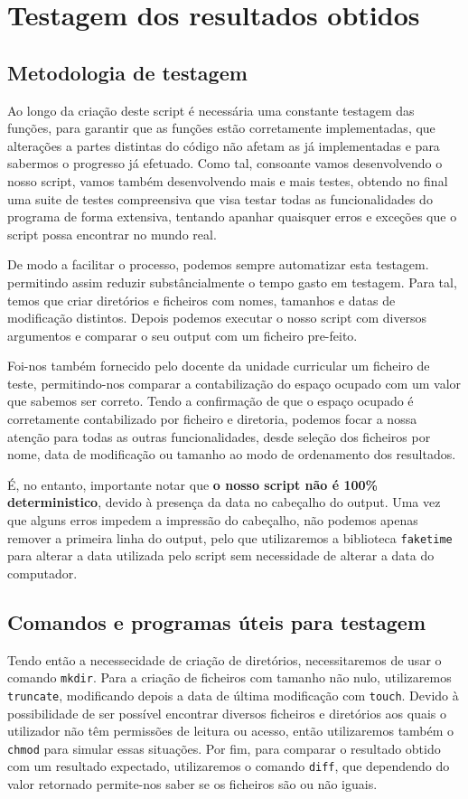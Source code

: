 \chapter{Testagem dos resultados obtidos}
\section{Metodologia de testagem}
Ao longo da criação deste script é necessária uma constante
testagem das funções, para garantir que as funções estão
corretamente implementadas, que alterações a partes
distintas do código não afetam as já implementadas e para
sabermos o progresso já efetuado. Como tal, consoante vamos
desenvolvendo o nosso script, vamos também desenvolvendo mais e
mais testes, obtendo no final uma suite de testes compreensiva
que visa testar todas as funcionalidades do programa de forma
extensiva, tentando apanhar quaisquer erros e exceções que o
script possa encontrar no mundo real.

De modo a facilitar o processo, podemos
sempre automatizar esta testagem. permitindo assim reduzir
substâncialmente o tempo gasto em testagem.
Para tal, temos que criar diretórios e ficheiros com nomes,
tamanhos e datas de modificação distintos. Depois podemos
executar o nosso script com diversos argumentos e comparar o
seu output com um ficheiro pre-feito.

Foi-nos também fornecido pelo docente da unidade
curricular um ficheiro de teste, permitindo-nos comparar a 
contabilização do espaço ocupado com um valor que sabemos ser 
correto. Tendo a confirmação de que o espaço ocupado é
corretamente contabilizado por ficheiro e diretoria, podemos
focar a nossa atenção para todas as outras funcionalidades,
desde seleção dos ficheiros por nome, data de modificação ou
tamanho ao modo de ordenamento dos resultados.

É, no entanto, importante notar que \textbf{o nosso script não é 100\%
deterministico}, devido à presença da data no cabeçalho do
output. Uma vez que alguns erros impedem a impressão do
cabeçalho, não podemos apenas remover a primeira linha do
output, pelo que utilizaremos a biblioteca \verb|faketime| para
alterar a data utilizada pelo script sem necessidade de alterar
a data do computador.

\section{Comandos e programas úteis para testagem}
Tendo então a necessecidade de criação de diretórios,
necessitaremos de usar o comando \verb|mkdir|. Para a
criação de ficheiros com tamanho não nulo,
utilizaremos \verb|truncate|, modificando depois a data de
última modificação com \verb|touch|. Devido à possibilidade de
ser possível encontrar diversos ficheiros e diretórios aos
quais o utilizador não têm permissões de leitura ou acesso,
então utilizaremos também o \verb|chmod| para simular essas
situações. Por fim, para comparar o resultado obtido com um 
resultado expectado, utilizaremos o comando \verb|diff|, 
que dependendo do valor retornado permite-nos saber se os
ficheiros são ou não iguais.

